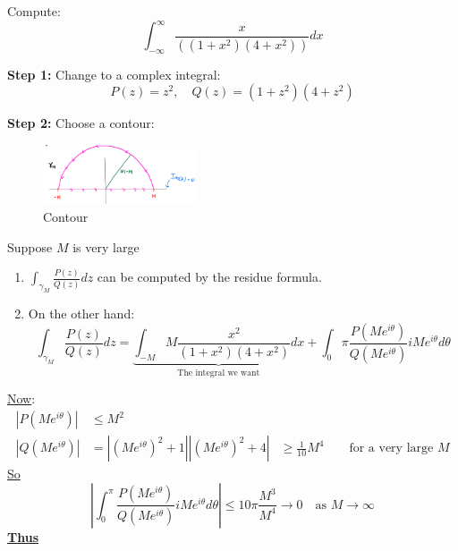 \begin{example}
    Compute:
    \begin{equation*}
        \int_{-\infty}^{\infty} \frac{x}{((1 + x^2)(4+ x^2))} dx
    \end{equation*}

    \textbf{Step 1:} Change to a complex integral:
    \begin{equation*}
        P(z) = z^2, \quad Q(z) = (1 + z^2)(4 + z^2)
    \end{equation*}

    \textbf{Step 2:} Choose a contour:
    \begin{figure}[H]
        \centering
        \includegraphics[width=0.4\textwidth]{LECTURE_11/contour.png}
        \caption{Contour}
        \label{fig:contour}
    \end{figure}
    Suppose $M$ is very large
    \begin{enumerate}
        \item $\int_{\gamma_M} \frac{P(z)}{Q(z)} dz$ can be computed by the residue formula.
        \item On the other hand:
              \begin{equation*}
                  \int_{\gamma_M} \frac{P(z)}{Q(z)} dz = \underbrace{\int_{-M}{M}\frac{x^2}{(1 + x^2)(4 + x^2)} dx}_{\text{The integral we want}} + \int_{0}{\pi} \frac{P(M e^{i\theta})}{Q(M e^{i\theta})} i M e^{i\theta} d\theta
              \end{equation*}
    \end{enumerate}
    \underline{Now}:
    \begin{align*}
        |P(Me^{i\theta})| & \leq M^2                                                \\
        |Q(Me^{i\theta})| & = |(Me^{i\theta})^2 + 1||(Me^{i\theta})^2 + 4|
                          & \geq \frac{1}{10} M^4 \qquad \text{for a very large } M
    \end{align*}
    \underline{So}
    \begin{equation*}
        \left| \int_0^\pi \frac{P(Me^{i\theta})}{Q(Me^{i\theta})} i M e^{i\theta} d\theta \right| \leq 10 \pi \frac{M^3}{M^4} \to 0 \quad \text{as } M \to \infty
    \end{equation*}
    \textbf{\underline{Thus}}

\end{example}
